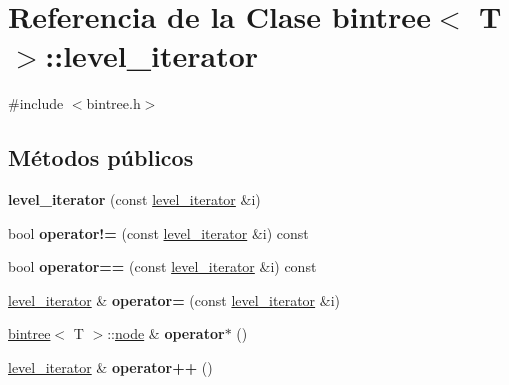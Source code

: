 \hypertarget{classbintree_1_1level__iterator}{}\section{Referencia de la Clase bintree$<$ T $>$\+:\+:level\+\_\+iterator}
\label{classbintree_1_1level__iterator}


{\ttfamily \#include $<$bintree.\+h$>$}

\subsection*{Métodos públicos}
\begin{DoxyCompactItemize}
\item 
{\bfseries level\+\_\+iterator} (const \hyperlink{classbintree_1_1level__iterator}{level\+\_\+iterator} \&i)\hypertarget{classbintree_1_1level__iterator_a2743a43a42d764094b7f88c156afddb7}{}\label{classbintree_1_1level__iterator_a2743a43a42d764094b7f88c156afddb7}

\item 
bool {\bfseries operator!=} (const \hyperlink{classbintree_1_1level__iterator}{level\+\_\+iterator} \&i) const \hypertarget{classbintree_1_1level__iterator_a47c98fc52972998f6c4d20625e16fcbc}{}\label{classbintree_1_1level__iterator_a47c98fc52972998f6c4d20625e16fcbc}

\item 
bool {\bfseries operator==} (const \hyperlink{classbintree_1_1level__iterator}{level\+\_\+iterator} \&i) const \hypertarget{classbintree_1_1level__iterator_afc6be99157896e0b7dd0564afa416498}{}\label{classbintree_1_1level__iterator_afc6be99157896e0b7dd0564afa416498}

\item 
\hyperlink{classbintree_1_1level__iterator}{level\+\_\+iterator} \& {\bfseries operator=} (const \hyperlink{classbintree_1_1level__iterator}{level\+\_\+iterator} \&i)\hypertarget{classbintree_1_1level__iterator_ac48932df7ad256f7775f4c9adac3ea5d}{}\label{classbintree_1_1level__iterator_ac48932df7ad256f7775f4c9adac3ea5d}

\item 
\hyperlink{classbintree}{bintree}$<$ T $>$\+::\hyperlink{classbintree_1_1node}{node} \& {\bfseries operator$\ast$} ()\hypertarget{classbintree_1_1level__iterator_a85223503f7a8dc79297b257b572cd4fd}{}\label{classbintree_1_1level__iterator_a85223503f7a8dc79297b257b572cd4fd}

\item 
\hyperlink{classbintree_1_1level__iterator}{level\+\_\+iterator} \& {\bfseries operator++} ()\hypertarget{classbintree_1_1level__iterator_a16ba4d7573233e52c12598c9ea2c3831}{}\label{classbintree_1_1level__iterator_a16ba4d7573233e52c12598c9ea2c3831}

\end{DoxyCompactItemize}
